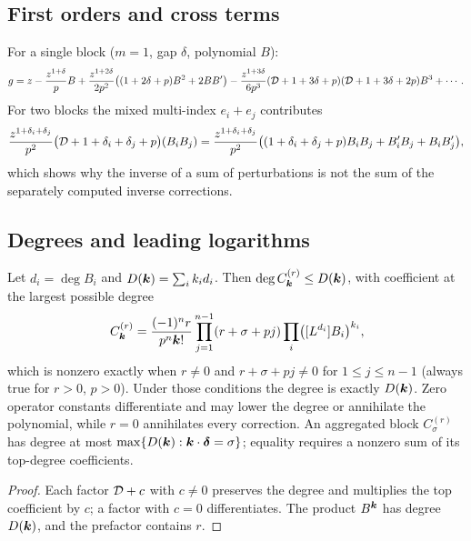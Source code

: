 \subsection{First orders and cross terms}

For a single block ($m=1$, gap $\delta$, polynomial $B$):
\begin{equation}
 g=z-\frac{z^{1+\delta}}{p}B+\frac{z^{1+2\delta}}{2p^2}\bigl((1+2\delta+p)B^2+2BB'\bigr)
 -\frac{z^{1+3\delta}}{6p^3}(\mathcal D+1+3\delta+p)(\mathcal D+1+3\delta+2p)B^3+\cdots .
 \label{eq:single-block}
\end{equation}
For two blocks the mixed multi-index $e_i+e_j$ contributes
\begin{equation}
 \frac{z^{1+\delta_i+\delta_j}}{p^2}\bigl(\mathcal D+1+\delta_i+\delta_j+p\bigr)(B_iB_j)
 =\frac{z^{1+\delta_i+\delta_j}}{p^2}\bigl((1+\delta_i+\delta_j+p)B_iB_j+B_i'B_j+B_iB_j'\bigr),
 \label{eq:cross}
\end{equation}
which shows why the inverse of a sum of perturbations is not the sum of the separately computed inverse corrections.

\subsection{Degrees and leading logarithms}

\begin{proposition}[Degrees]
\label{prop:degrees}
Let $d_i=\deg B_i$ and $D(\boldsymbol k)=\sum_ik_id_i$. Then $\deg C^{(r)}_{\boldsymbol k}\le D(\boldsymbol k)$, with coefficient at the largest possible degree
\begin{equation}
 [L^{D(\bk)}]\,C^{(r)}_{\bk}=\frac{(-1)^nr}{p^n\bk!}\prod_{j=1}^{n-1}(r+\sigma+pj)\prod_i\bigl([L^{d_i}]B_i\bigr)^{k_i},
 \label{eq:leading-coefficient}
\end{equation}
which is nonzero exactly when $r\ne0$ and $r+\sigma+pj\ne0$ for $1\le j\le n-1$ (always true for $r>0$, $p>0$). Under those conditions the degree is exactly $D(\boldsymbol k)$. Zero operator constants differentiate and may lower the degree or annihilate the polynomial, while $r=0$ annihilates every correction. An aggregated block $C^{(r)}_\sigma$ has degree at most $\max\{D(\boldsymbol k):\boldsymbol k\cdot\boldsymbol\delta=\sigma\}$; equality requires a nonzero sum of its top-degree coefficients.
\end{proposition}
\begin{proof}
Each factor $\mathcal D+c$ with $c\ne0$ preserves the degree and multiplies the top coefficient by $c$; a factor with $c=0$ differentiates. The product $B^{\boldsymbol k}$ has degree $D(\boldsymbol k)$, and the prefactor contains $r$.
\end{proof}

